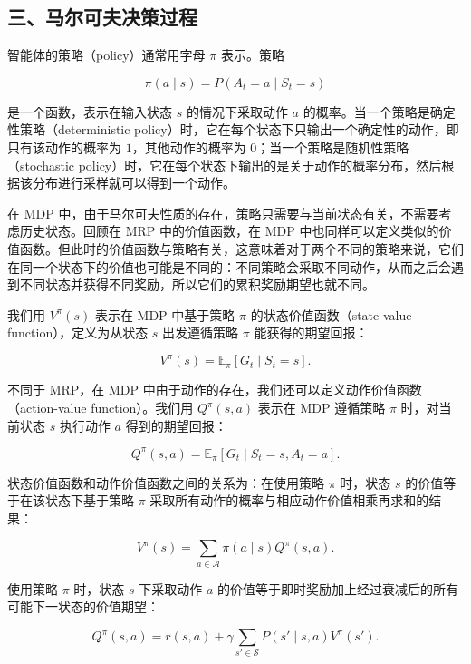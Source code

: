 \hypertarget{ux4e09ux9a6cux5c14ux53efux592bux51b3ux7b56ux8fc7ux7a0b}{%
\subsection{三、马尔可夫决策过程}\label{ux4e09ux9a6cux5c14ux53efux592bux51b3ux7b56ux8fc7ux7a0b}}

智能体的策略（policy）通常用字母 \(\pi\) 表示。策略

\[
\pi(a\mid s)=P(A_t=a\mid S_t=s)
\]

是一个函数，表示在输入状态 \(s\) 的情况下采取动作 \(a\) 的概率。当一个策略是确定性策略（deterministic policy）时，它在每个状态下只输出一个确定性的动作，即只有该动作的概率为 \(1\)，其他动作的概率为 \(0\)；当一个策略是随机性策略（stochastic policy）时，它在每个状态下输出的是关于动作的概率分布，然后根据该分布进行采样就可以得到一个动作。

在 MDP 中，由于马尔可夫性质的存在，策略只需要与当前状态有关，不需要考虑历史状态。回顾在 MRP 中的价值函数，在 MDP 中也同样可以定义类似的价值函数。但此时的价值函数与策略有关，这意味着对于两个不同的策略来说，它们在同一个状态下的价值也可能是不同的：不同策略会采取不同动作，从而之后会遇到不同状态并获得不同奖励，所以它们的累积奖励期望也就不同。

我们用 \(V^{\pi}(s)\) 表示在 MDP 中基于策略 \(\pi\) 的状态价值函数（state-value function），定义为从状态 \(s\) 出发遵循策略 \(\pi\) 能获得的期望回报：

\[
V^{\pi}(s)=\mathbb{E}_{\pi}[G_t\mid S_t=s].
\]

不同于 MRP，在 MDP 中由于动作的存在，我们还可以定义动作价值函数（action-value function）。我们用 \(Q^{\pi}(s,a)\) 表示在 MDP 遵循策略 \(\pi\) 时，对当前状态 \(s\) 执行动作 \(a\) 得到的期望回报：

\[
Q^{\pi}(s,a)=\mathbb{E}_{\pi}[G_t\mid S_t=s,A_t=a].
\]

状态价值函数和动作价值函数之间的关系为：在使用策略 \(\pi\) 时，状态 \(s\) 的价值等于在该状态下基于策略 \(\pi\) 采取所有动作的概率与相应动作价值相乘再求和的结果：

\[
V^{\pi}(s)=\sum_{a\in\mathcal{A}}\pi(a\mid s)Q^{\pi}(s,a).
\]

使用策略 \(\pi\) 时，状态 \(s\) 下采取动作 \(a\) 的价值等于即时奖励加上经过衰减后的所有可能下一状态的价值期望：

\[
Q^{\pi}(s,a)=r(s,a)+\gamma\sum_{s'\in\mathcal{S}}P(s'\mid s,a)V^{\pi}(s').
\]

